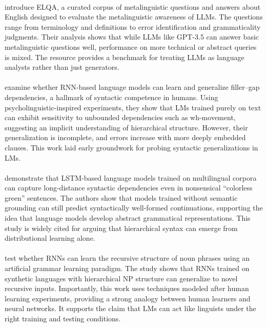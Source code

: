 \paragraph{} \citet{behzad2023elqa} introduce ELQA, a curated corpus of metalinguistic questions and answers about English designed to evaluate the metalinguistic awareness of LLMs. The questions range from terminology and definitions to error identification and grammaticality judgments. Their analysis shows that while LLMs like GPT-3.5 can answer basic metalinguistic questions well, performance on more technical or abstract queries is mixed. The resource provides a benchmark for treating LLMs as language analysts rather than just generators.

\paragraph{} \citet{wilcox2018filler} examine whether RNN-based language models can learn and generalize filler--gap dependencies, a hallmark of syntactic competence in humans. Using psycholinguistic-inspired experiments, they show that LMs trained purely on text can exhibit sensitivity to unbounded dependencies such as wh-movement, suggesting an implicit understanding of hierarchical structure. However, their generalization is incomplete, and errors increase with more deeply embedded clauses. This work laid early groundwork for probing syntactic generalizations in LMs.

\paragraph{} \citet{gulordava2018colorless} demonstrate that LSTM-based language models trained on multilingual corpora can capture long-distance syntactic dependencies even in nonsensical ``colorless green'' sentences. The authors show that models trained without semantic grounding can still predict syntactically well-formed continuations, supporting the idea that language models develop abstract grammatical representations. This study is widely cited for arguing that hierarchical syntax can emerge from distributional learning alone.

\paragraph{} \citet{matusevych2022trees} test whether RNNs can learn the recursive structure of noun phrases using an artificial grammar learning paradigm. The study shows that RNNs trained on synthetic languages with hierarchical NP structure can generalize to novel recursive inputs. Importantly, this work uses techniques modeled after human learning experiments, providing a strong analogy between human learners and neural networks. It supports the claim that LMs can act like linguists under the right training and testing conditions.

